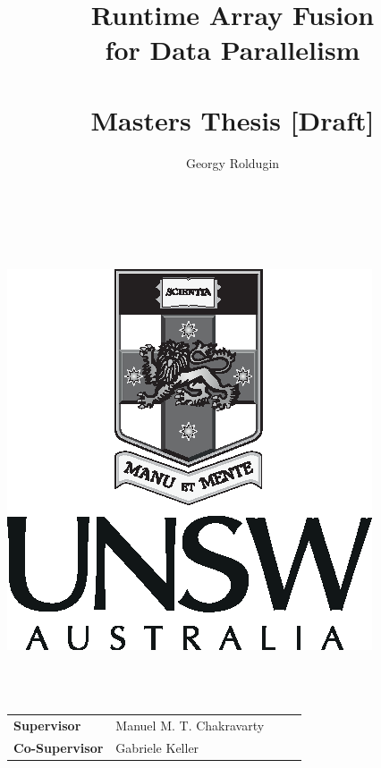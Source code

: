 \documentclass[preamble.tex]{subfiles}
\begin{document}
\title{Runtime Array Fusion\\
for Data Parallelism\\
\ \\
Masters Thesis [Draft]}


\author{Georgy Roldugin}

\maketitle
~\\
\\


\begin{center}
\includegraphics{img/UNSW-PortraitGreyscale-Black}
\par\end{center}

~\\
\\


\begin{center}

\par\end{center}

\begin{center}
\begin{tabular}{ll}
\textbf{Supervisor} & Manuel M. T. Chakravarty~~~~~\tabularnewline
\textbf{Co-Supervisor} & Gabriele Keller\tabularnewline
\end{tabular}
\par\end{center}
\end{document}
